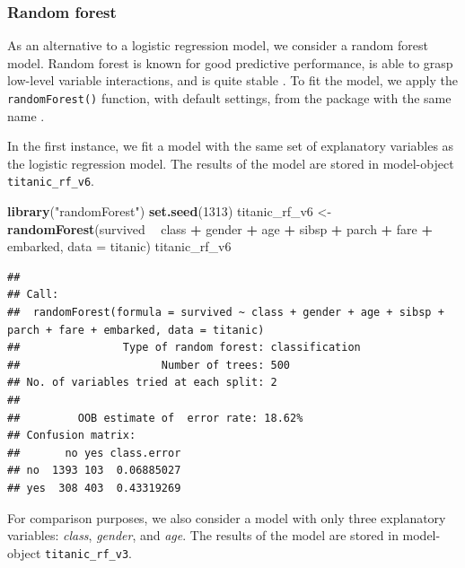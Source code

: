 \documentclass[12pt,]{krantz}
\newenvironment{Shaded}{\begin{snugshade}}{\end{snugshade}}
\newcommand{\DataTypeTok}[1]{\textcolor[rgb]{0.13,0.29,0.53}{#1}}
\newcommand{\DecValTok}[1]{\textcolor[rgb]{0.00,0.00,0.81}{#1}}
\newcommand{\KeywordTok}[1]{\textcolor[rgb]{0.13,0.29,0.53}{\textbf{#1}}}
\newcommand{\NormalTok}[1]{#1}
\newcommand{\OperatorTok}[1]{\textcolor[rgb]{0.81,0.36,0.00}{\textbf{#1}}}
\newcommand{\StringTok}[1]{\textcolor[rgb]{0.31,0.60,0.02}{#1}}
\theoremstyle{definition}
\theoremstyle{definition}
\theoremstyle{definition}
\theoremstyle{remark}
\begin{document}
\hypertarget{model-titanic-rf}{%
\subsubsection{Random forest}\label{model-titanic-rf}}

As an alternative to a logistic regression model, we consider a random
forest model. Random forest is known for good predictive performance, is
able to grasp low-level variable interactions, and is quite stable
\citep{randomForestBreiman}. To fit the model, we apply the
\texttt{randomForest()} function, with default settings, from the
package with the same name \citep{randomForestRNews}.

In the first instance, we fit a model with the same set of explanatory
variables as the logistic regression model. The results of the model are
stored in model-object \texttt{titanic\_rf\_v6}.

\begin{Shaded}
\begin{Highlighting}[]
\KeywordTok{library}\NormalTok{(}\StringTok{"randomForest"}\NormalTok{)}
\KeywordTok{set.seed}\NormalTok{(}\DecValTok{1313}\NormalTok{)}
\NormalTok{titanic_rf_v6 <-}\StringTok{ }\KeywordTok{randomForest}\NormalTok{(survived }\OperatorTok{~}\StringTok{ }\NormalTok{class }\OperatorTok{+}\StringTok{ }\NormalTok{gender }\OperatorTok{+}\StringTok{ }\NormalTok{age }\OperatorTok{+}\StringTok{ }\NormalTok{sibsp }\OperatorTok{+}\StringTok{ }\NormalTok{parch }\OperatorTok{+}\StringTok{ }\NormalTok{fare }\OperatorTok{+}\StringTok{ }\NormalTok{embarked, }
                           \DataTypeTok{data =}\NormalTok{ titanic)}
\NormalTok{titanic_rf_v6}
\end{Highlighting}
\end{Shaded}

\begin{verbatim}
## 
## Call:
##  randomForest(formula = survived ~ class + gender + age + sibsp +      parch + fare + embarked, data = titanic) 
##                Type of random forest: classification
##                      Number of trees: 500
## No. of variables tried at each split: 2
## 
##         OOB estimate of  error rate: 18.62%
## Confusion matrix:
##       no yes class.error
## no  1393 103  0.06885027
## yes  308 403  0.43319269
\end{verbatim}

For comparison purposes, we also consider a model with only three
explanatory variables: \emph{class}, \emph{gender}, and \emph{age}. The
results of the model are stored in model-object
\texttt{titanic\_rf\_v3}.
\end{document}
